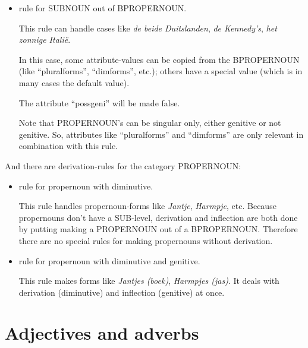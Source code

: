 \begin{itemize}
   \item rule for SUBNOUN out of BPROPERNOUN.

         This rule can handle cases like {\em de beide Duitslanden}, {\em de 
         Kennedy's}, {\em het zonnige Itali\"{e}}.

         In this case, some attribute-values can be copied from the BPROPERNOUN
         (like ``pluralforms'', ``dimforms'', etc.);
         others have a special value (which is in many cases the default value).

         The attribute ``possgeni'' will be made false.

         Note that PROPERNOUN's can be singular only, either genitive or not 
         genitive. So, attributes like ``pluralforms'' and ``dimforms'' are 
         only relevant in combination with this rule.

\end{itemize}

And there are derivation-rules for the category  PROPERNOUN:

\begin{itemize}
   \item rule for propernoun with diminutive.
    
         This rule handles propernoun-forms like {\em Jantje}, {\em Harmpje},
         etc. Because propernouns don't have a SUB-level, derivation and 
         inflection are both done by putting making a PROPERNOUN out of a
         BPROPERNOUN. Therefore there are no special rules for making 
         propernouns without derivation.

   \item rule for propernoun with diminutive and genitive.

         This rule makes forms like {\em Jantjes (boek)}, {\em Harmpjes (jas)}.
         It deals with derivation (diminutive) and inflection (genitive) at 
         once. 
         
\end{itemize}

\newpage

\section{Adjectives and adverbs}

